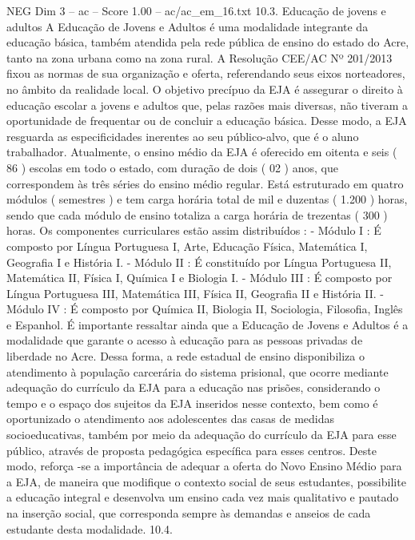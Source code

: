 \begin{textsample}{NEG Dim 3 – ac – Score 1.00 – ac/ac\_em\_16.txt}  \label{ex:f3_neg_269}
10.3.
Educação de jovens e adultos A Educação de Jovens e Adultos é uma modalidade integrante da educação básica, também atendida pela rede pública de ensino do estado do Acre, tanto na zona urbana como na zona rural.
A Resolução CEE/AC Nº 201/2013 fixou as normas de sua organização e oferta, referendando seus eixos norteadores, no âmbito da realidade local.
O objetivo precípuo da EJA é assegurar o direito à educação escolar a jovens e adultos que, pelas razões mais diversas, não tiveram a oportunidade de frequentar ou de concluir a educação básica.
Desse modo, a EJA resguarda as especificidades inerentes ao seu público-alvo, que é o aluno trabalhador.
Atualmente, o ensino médio da EJA é oferecido em oitenta e seis ( 86 ) escolas em todo o estado, com duração de dois ( 02 ) anos, que correspondem às três séries do ensino médio regular.
Está estruturado em quatro módulos ( semestres ) e tem carga horária total de mil e duzentas ( 1.200 ) horas, sendo que cada módulo de ensino totaliza a carga horária de trezentas ( 300 ) horas.
Os componentes curriculares estão assim distribuídos : - Módulo I : É composto por Língua Portuguesa I, Arte, Educação Física, Matemática I, Geografia I e História I. - Módulo II : É constituído por Língua Portuguesa II, Matemática II, Física I, Química I e Biologia I. - Módulo III : É composto por Língua Portuguesa III, Matemática III, Física II, Geografia II e História II. - Módulo IV : É composto por Química II, Biologia II, Sociologia, Filosofia, Inglês e Espanhol.
É importante ressaltar ainda que a Educação de Jovens e Adultos é a modalidade que garante o acesso à educação para as pessoas privadas de liberdade no Acre.
Dessa forma, a rede estadual de ensino disponibiliza o atendimento à população carcerária do sistema prisional, que ocorre mediante adequação do currículo da EJA para a educação nas prisões, considerando o tempo e o espaço dos sujeitos da EJA inseridos nesse contexto, bem como é oportunizado o atendimento aos adolescentes das casas de medidas socioeducativas, também por meio da adequação do currículo da EJA para esse público, através de proposta pedagógica específica para esses centros.
Deste modo, reforça -se a importância de adequar a oferta do Novo Ensino Médio para a EJA, de maneira que modifique o contexto social de seus estudantes, possibilite a educação integral e desenvolva um ensino cada vez mais qualitativo e pautado na inserção social, que corresponda sempre às demandas e anseios de cada estudante desta modalidade. 10.4.

\end{textsample}
